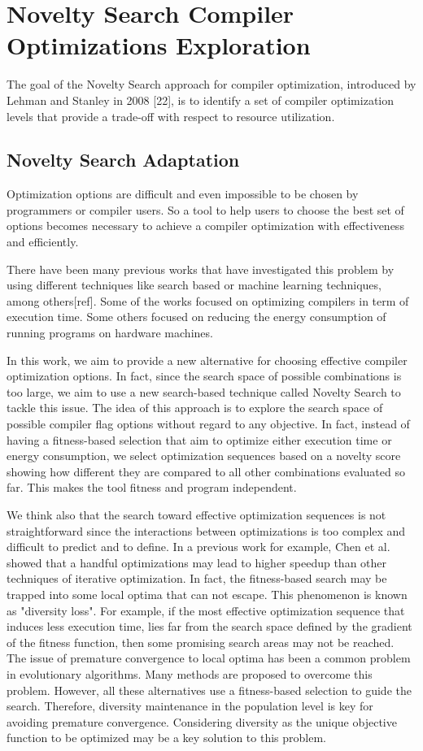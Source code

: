 \section{Novelty Search Compiler Optimizations Exploration}
 
The goal of the Novelty Search approach for compiler optimization, introduced by Lehman and Stanley in 2008
[22], is to identify a set of compiler optimization levels that provide a trade-off with respect to resource utilization. 

\subsection{Novelty Search Adaptation}
Optimization options are difficult and even impossible to be chosen by programmers or compiler users. So a tool to help users to choose the best set of options becomes necessary to achieve a compiler optimization with effectiveness and efficiently. 

There have been many previous works that have investigated this problem by using different techniques like search based or machine learning techniques, among others[ref]. Some of the works focused on optimizing compilers in term of execution time. Some others focused on reducing the energy consumption of running programs on hardware machines.

In this work, we aim to provide a new alternative for choosing effective compiler optimization options. In fact, since the search space of possible combinations is too large, we aim to use a new search-based technique called Novelty Search to tackle this issue. The idea of this approach is to explore the search space of possible compiler flag options without regard to any objective. In fact, instead of having a fitness-based selection that aim to optimize either execution time or energy consumption, we select optimization sequences based on a novelty score showing how different they are compared to all other combinations evaluated so far. This makes the tool fitness and program independent.

We think also that the search toward effective optimization sequences is not straightforward since the interactions between optimizations is too complex and difficult to predict and to define. In a previous work for example, Chen et al. \cite{chen2012deconstructing}showed that a handful optimizations may lead to higher speedup than other techniques of iterative optimization. In fact, the fitness-based search may be trapped into some local optima that can not escape. This phenomenon is known as "diversity loss". For example, if the most effective optimization sequence that induces less execution time, lies far from the search space defined by the gradient of the fitness function, then some promising search areas may not be reached. The issue of premature convergence to local optima has been a common problem in evolutionary algorithms. Many methods are proposed to overcome this
problem. However, all these alternatives use a fitness-based selection to guide the search. 
Therefore, diversity maintenance in the population level is key for avoiding premature convergence. Considering diversity as the unique objective function to be optimized may be a key solution to this problem.

